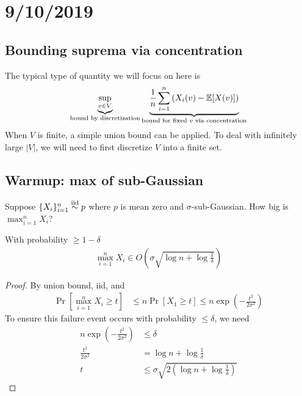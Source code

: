 \section{9/10/2019}

\subsection{Bounding suprema via concentration}

The typical type of quantity we will focus on here is
\begin{align}
    \underbrace{\sup_{v \in V}}_{\text{bound by discretization}}
    \underbrace{\frac{1}{n} \sum_{i=1}^n \left(X_i(v) - \mathbb{E}[X(v)] \right)}_{\text{bound for fixed $v$ via concentration}}\label{eq:typical-sup-via-concentration}
\end{align}
When $V$ is finite, a simple union bound can be applied.
To deal with infinitely large $\lvert V \rvert$, we will need to first discretize $V$ into
a finite set.

\subsection{Warmup: max of sub-Gaussian}

Suppose $\{X_i\}_{i=1}^n \overset{\text{iid}}{\sim} p$ where $p$ is mean zero and $\sigma$-sub-Gaussian.
How big is $\max_{i=1}^n X_i$?

\begin{lemma}\label{lem:concentration-max-sub-gaussian}
    With probability $\geq 1 - \delta$
    \begin{align}
        \max_{i=1}^n X_i \in O\left(\sigma \sqrt{\log n + \log \frac{1}{\delta}} \right)
    \end{align}
\end{lemma}

\begin{proof}
    By union bound, iid, and 
    \begin{align}
        \Pr\left[\max_{i=1}^n X_i \geq t \right] 
        &\leq n \Pr[X_1 \geq t]
        \leq n \exp\left(-\frac{t^2}{2 \sigma^2}\right)
    \end{align}
    To ensure this failure event occurs with probability $\leq \delta$, we need
    \begin{align}
        n \exp\left(-\frac{t^2}{2 \sigma^2}\right) &\leq \delta \\
        \frac{t^2}{2 \sigma^2} &= \log n + \log \frac{1}{\delta} \\
        t &\leq \sigma \sqrt{2\left(\log n + \log \frac{1}{\delta} \right)}
    \end{align}
\end{proof}

